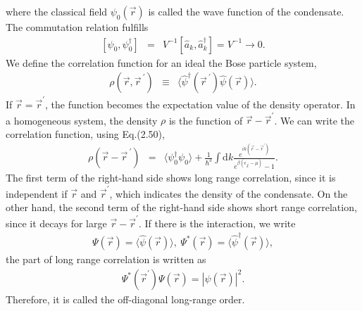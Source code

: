 \documentclass[12pt,a4paper]{report} %
\newcommand{\diff}{\mathrm{d}}				%
\begin{document}
where the classical field $\psi_0 ( \vec{r} )$ is called the wave function of the condensate.
The commutation relation fulfills 
\begin{eqnarray}
\left[ \psi_0, \psi^\dagger_0 \right] & = & V^{-1} \left[ \hat{a}_k, \hat{a}^\dagger_k \right]
= V^{-1} \rightarrow 0.
\end{eqnarray}
We define the correlation function for an ideal the Bose particle system,
\begin{eqnarray}
\rho( \vec{r}, \vec{r}^{\ \prime} ) & \equiv & \langle \hat{\psi}^\dagger(\vec{r}^{\ \prime}) \hat{\psi}( \vec{r} ) \rangle.
\end{eqnarray}
If $\vec{r} = \vec{r}^\prime$, the function becomes the expectation value of the density operator.
In a homogeneous system, the density $\rho$ is the function of $\vec{r} - \vec{r}^\prime$.
We can write the correlation function, using Eq.(2.50),
\begin{eqnarray}
\rho( \vec{r} - \vec{r}^{\ \prime} ) & = & \langle \psi^\dagger_0 \psi_0 \rangle
+ \frac{1}{\hbar^3} \int \diff k \frac{e^{i k  (\vec{r} - \vec{r}^{\prime})}}
{e^{\beta (\epsilon_{\vec{k}} - \mu)} - 1}.
\end{eqnarray}
The first term of the right-hand side shows long range correlation, since
it is independent if $\vec{r}$ and $\vec{r}^\prime$, which indicates the density of the condensate.
On the other hand, the second term of the right-hand side shows short range correlation,
since it decays for large $\vec{r} - \vec{r}^\prime$.
If there is the interaction, we write
\begin{eqnarray}
\varPsi( \vec{r} ) = \langle \hat{\psi}(\vec{r}) \rangle, \ \varPsi^*( \vec{r} ) = \langle \hat{\psi}^\dagger(\vec{r}) \rangle,
\end{eqnarray}
the part of long range correlation is written %
as
\begin{eqnarray}
\varPsi^*(\vec{r}^\prime) \varPsi(\vec{r}) = |\psi(\vec{r})|^2.
\end{eqnarray}
Therefore, it is called the off-diagonal long-range order.
\end{document}
